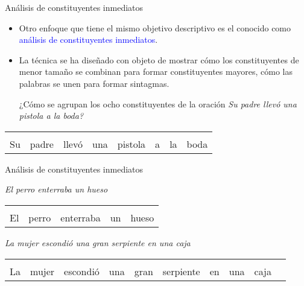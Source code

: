 \documentclass{beamer}
\begin{document}
\begin{frame}{Análisis de constituyentes inmediatos}

\begin{itemize}
	\item Otro enfoque que tiene el mismo objetivo descriptivo es el conocido como \textcolor{blue}{análisis de constituyentes inmediatos}.
	\item La técnica se ha diseñado con objeto de mostrar cómo los constituyentes de menor tamaño se combinan para formar constituyentes mayores, cómo las palabras se unen para formar sintagmas.
	
	¿Cómo se agrupan los ocho constituyentes de la oración \it{Su padre llevó una pistola a la boda}?
\end{itemize}

\pause

\begin{center}
\begin{tabular}{|l|l|l|l|l|l|l|l|}
\hline 
\multicolumn{2}{|l|}{} & \multicolumn{3}{|l|}{} & \multicolumn{3}{|l|}{} \\
\cline{2-2}
\cline{4-5}
\cline{7-8}
Su & padre & llevó & una & pistola & a & la & boda\\ 
\hline 
\end{tabular}
\end{center}
\end{frame}


\begin{frame}{Análisis de constituyentes inmediatos}

\it{El perro enterraba un hueso}

\begin{center}
\begin{tabular}{|l|l|l|l|l|}
\hline 
\multicolumn{2}{|l|}{} & \multicolumn{3}{|l|}{} \\
\cline{2-2}
\cline{4-5}
El & perro & enterraba & un & hueso \\ 
\hline 
\end{tabular}
\end{center}

\it{La mujer escondió una gran serpiente en una caja}

\begin{center}
\begin{tabular}{|l|l|l|l|l|l|l|l|l|l|}
\hline 
\multicolumn{2}{|l|}{} & \multicolumn{4}{|l|}{} & \multicolumn{3}{|l|}{} \\
\cline{2-2}
\cline{4-6}
\cline{8-9}
La & mujer & escondió & una & gran & serpiente & en & una & caja \\ 
\hline 
\end{tabular}
\end{center}

\end{frame}
\end{document}
